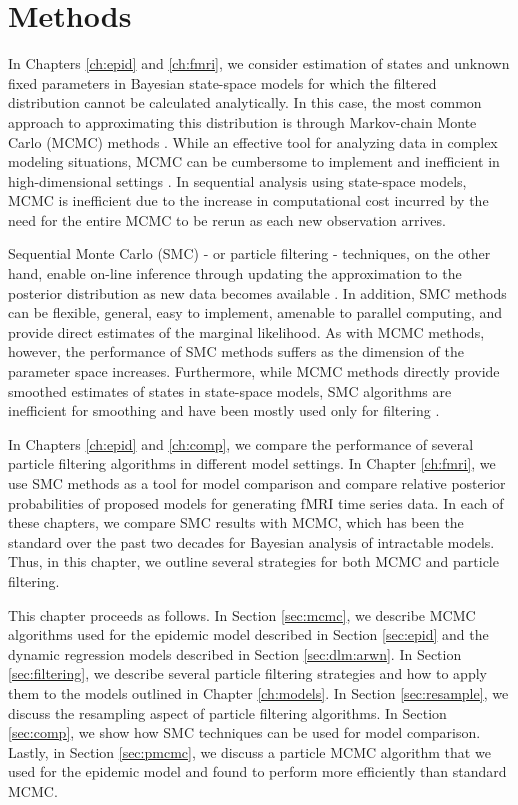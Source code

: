\chapter{Methods \label{ch:meth}}

In Chapters \ref{ch:epid} and \ref{ch:fmri}, we consider estimation of states and unknown fixed parameters in Bayesian state-space models for which the filtered distribution cannot be calculated analytically. In this case, the most common approach to approximating this distribution is through Markov-chain Monte Carlo (MCMC) methods \citep{Gelf:Smit:samp:1990}. While an effective tool for analyzing data in complex modeling situations, MCMC can be cumbersome to implement and inefficient in high-dimensional settings \cite[Chapter 8][]{Robe:Case:mont:2004}. In sequential analysis using state-space models, MCMC is inefficient due to the increase in computational cost incurred by the need for the entire MCMC to be rerun as each new observation arrives.

Sequential Monte Carlo (SMC) - or particle filtering - techniques, on the other hand, enable on-line inference through updating the approximation to the posterior distribution as new data becomes available \citep{Douc:deFr:Gord:sequ:2001, cappe2007overview}. In addition, SMC methods can be flexible, general, easy to implement, amenable to parallel computing, and provide direct estimates of the marginal likelihood. As with MCMC methods, however, the performance of SMC methods suffers as the dimension of the parameter space increases. Furthermore, while MCMC methods directly provide smoothed estimates of states in state-space models, SMC algorithms are inefficient for smoothing and have been mostly used only for filtering \cite[Section 5][]{douc:joh:tut:2009}.

In Chapters \ref{ch:epid} and \ref{ch:comp}, we compare the performance of several particle filtering algorithms in different model settings. In Chapter \ref{ch:fmri}, we use SMC methods as a tool for model comparison and compare relative posterior probabilities of proposed models for generating fMRI time series data. In each of these chapters, we compare SMC results with MCMC, which has been the standard over the past two decades for Bayesian analysis of intractable models. Thus, in this chapter, we outline several strategies for both MCMC and particle filtering. 

This chapter proceeds as follows. In Section \ref{sec:mcmc}, we describe MCMC algorithms used for the epidemic model described in Section \ref{sec:epid} and the dynamic regression models described in Section \ref{sec:dlm:arwn}. In Section \ref{sec:filtering}, we describe several particle filtering strategies and how to apply them to the models outlined in Chapter \ref{ch:models}. In Section \ref{sec:resample}, we discuss the resampling aspect of particle filtering algorithms. In Section \ref{sec:comp}, we show how SMC techniques can be used for model comparison. Lastly, in Section \ref{sec:pmcmc}, we discuss a particle MCMC algorithm that we used for the epidemic model and found to perform more efficiently than standard MCMC.


